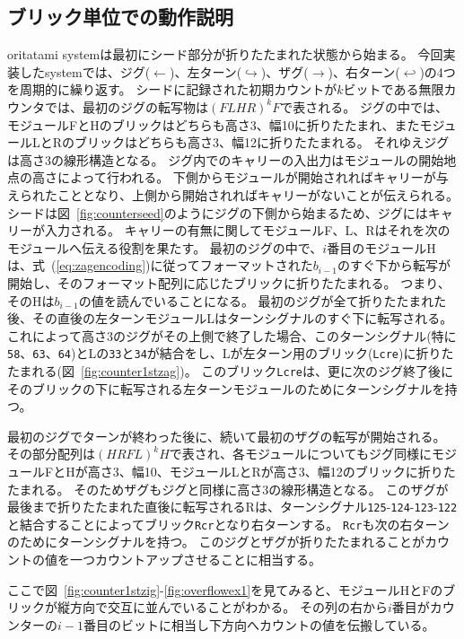 \documentclass[a4,11pt]{article}
\begin{document}
\subsection{ブリック単位での動作説明}
oritatami systemは最初にシード部分が折りたたまれた状態から始まる。
今回実装したsystemでは、ジグ($\leftarrow$)、左ターン($\hookrightarrow$)、ザグ($\rightarrow$)、右ターン($\hookleftarrow$)の4つを周期的に繰り返す。
シードに記録された初期カウントが$k$ビットである無限カウンタでは、最初のジグの転写物は$(FLHR)^k F$で表される。
ジグの中では、モジュールFとHのブリックはどちらも高さ3、幅10に折りたたまれ、またモジュールLとRのブリックはどちらも高さ3、幅12に折りたたまれる。
それゆえジグは高さ3の線形構造となる。
%
ジグ内でのキャリーの入出力はモジュールの開始地点の高さによって行われる。
下側からモジュールが開始されればキャリーが与えられたこととなり、上側から開始されればキャリーがないことが伝えられる。
シードは図~\ref{fig:counterseed}のようにジグの下側から始まるため、ジグにはキャリーが入力される。
キャリーの有無に関してモジュールF、L、Rはそれを次のモジュールへ伝える役割を果たす。
%
最初のジグの中で、$i$番目のモジュールHは、式~(\ref{eq:zagencoding})に従ってフォーマットされた$b_{i-1}$のすぐ下から転写が開始し、そのフォーマット配列に応じたブリックに折りたたまれる。
つまり、そのHは$b_{i-1}$の値を読んでいることになる。
最初のジグが全て折りたたまれた後、その直後の左ターンモジュールLはターンシグナルのすぐ下に転写される。これによって高さ3のジグがその上側で終了した場合、このターンシグナル(特に\texttt{58}、\texttt{63}、\texttt{64})とLの\texttt{33}と\texttt{34}が結合をし、Lが左ターン用のブリック(\texttt{Lcre})に折りたたまれる(図~\ref{fig:counter1stzag})。
このブリック\texttt{Lcre}は、更に次のジグ終了後にそのブリックの下に転写される左ターンモジュールのためにターンシグナルを持つ。

最初のジグでターンが終わった後に、続いて最初のザグの転写が開始される。
その部分配列は$(HRFL)^k H$で表され、各モジュールについてもジグ同様にモジュールFとHが高さ3、幅10、モジュールLとRが高さ3、幅12のブリックに折りたたまれる。
そのためザグもジグと同様に高さ3の線形構造となる。
このザグが最後まで折りたたまれた直後に転写されるRは、ターンシグナル\texttt{125}-\texttt{124}-\texttt{123}-\texttt{122}と結合することによってブリック\texttt{Rcr}となり右ターンする。
\texttt{Rcr}も次の右ターンのためにターンシグナルを持つ。
このジグとザグが折りたたまれることがカウントの値を一つカウントアップさせることに相当する。

ここで図~\ref{fig:counter1stzig}-\ref{fig:overflowex1}を見てみると、モジュールHとFのブリックが縦方向で交互に並んでいることがわかる。
その列の右から$i$番目がカウンターの$i{-}1$番目のビットに相当し下方向へカウントの値を伝搬している。
\end{document}
